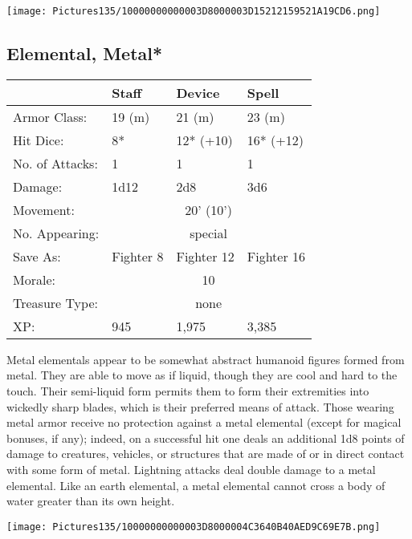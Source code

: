 \documentclass[a4paper,twoside,openany,10pt]{book}
\begin{document}
\begin{multicols}{2}
\begin{center}
	\texttt{[image: Pictures135/10000000000003D8000003D15212159521A19CD6.png]}
\end{center}


\subsection*{Elemental, Metal*}\label{elemental-metal}

\begin{tabularx}{0.48\textwidth}{@{}lllX@{}}
& Staff & Device & Spell \\\hline
Armor Class: & 19 (m) & 21 (m) & 23 (m) \\\hline
Hit Dice: & 8* & 12* (+10) & 16* (+12) \\\hline
No. of Attacks: & 1 & 1 & 1 \\\hline
Damage: & 1d12 & 2d8 & 3d6 \\\hline
Movement:  & \multicolumn{3}{c}{20' (10')}\\\hline
No. Appearing: &\multicolumn{3}{c}{special} \\\hline
Save As: & Fighter 8 & Fighter 12 & Fighter 16 \\\hline
Morale: & \multicolumn{3}{c}{10} \\\hline
Treasure Type: & \multicolumn{3}{c}{none} \\\hline
XP: & 945 & 1,975 & 3,385 \\\hline
\end{tabularx}\medskip

Metal elementals appear to be somewhat abstract humanoid figures formed from metal. They are able to move as if liquid, though they are cool and hard to the touch. Their semi-liquid form permits them to form their extremities into wickedly sharp blades, which is their preferred means of attack. Those wearing metal armor receive no protection against a metal elemental (except for magical bonuses, if any); indeed, on a successful hit one deals an additional 1d8 points of damage to creatures, vehicles, or structures that are made of or in direct contact with some form of metal. Lightning attacks deal double damage to a metal elemental. Like an earth elemental, a metal elemental cannot cross a body of water greater than its own height.

\begin{center}
	\texttt{[image: Pictures135/10000000000003D8000004C3640B40AED9C69E7B.png]}
\end{center}


\end{multicols}
\end{document}
